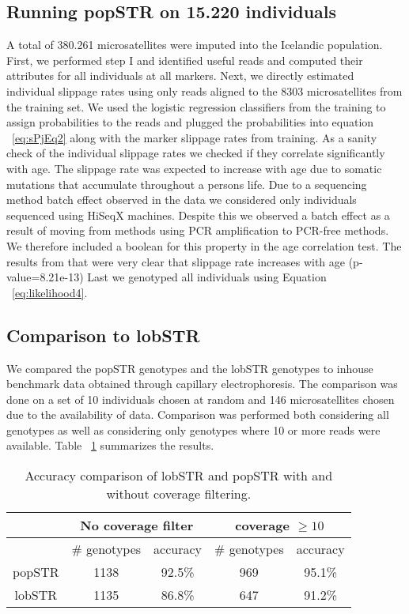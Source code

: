 \documentclass{bioinfo}
\begin{document}
\subsection{Running popSTR on 15.220 individuals}
A total of 380.261 microsatellites were imputed into the Icelandic population.
First, we performed step I and identified useful reads and computed their attributes for all individuals at all markers. Next, we directly estimated individual slippage rates using only reads aligned to the 8303 microsatellites from the training set. We used the logistic regression classifiers from the training to assign probabilities to the reads and plugged the probabilities into equation ~\ref{eq:sPjEq2} along with the marker slippage rates from training. 
As a sanity check of the individual slippage rates we checked if they correlate significantly with age. The slippage rate was expected to increase with age due to somatic mutations that accumulate throughout a persons life. Due to a sequencing method batch effect observed in the data we considered only individuals sequenced using HiSeqX machines. Despite this we observed a batch effect as a result of moving from methods using PCR amplification to PCR-free methods. We therefore included a boolean for this property in the age correlation test. The results from that were very clear that slippage rate increases with age (p-value=8.21e-13)
Last we genotyped all individuals using Equation ~\ref{eq:likelihood4}.

\subsection{Comparison to lobSTR}
We compared the popSTR genotypes and the lobSTR genotypes to inhouse benchmark data obtained through capillary electrophoresis. The comparison was done on a set of 10 individuals chosen at random and 146 microsatellites chosen due to the availability of data. 
Comparison was performed both considering all genotypes as well as considering only genotypes where 10 or more reads were available. Table ~\ref{table:lobSTRcomp} summarizes the results. 
\begin{table}[H]
    \caption{Accuracy comparison of lobSTR and popSTR with and without coverage filtering.}
    \begin{tabular}{ c | c | c | c | c |}
         & \multicolumn{2}{c}{No coverage filter} & \multicolumn{2}{c}{coverage $ \geq 10$} \\
         \hline
         & \# genotypes & accuracy & \# genotypes & accuracy \\
         \hline
        popSTR & 1138 & 92.5\% & 969 & 95.1\% \\
        \hline
        lobSTR & 1135 & 86.8\% & 647 & 91.2\% \\
        \hline
    \end{tabular}
    \label{table:lobSTRcomp}
\end{table}
\end{document}
